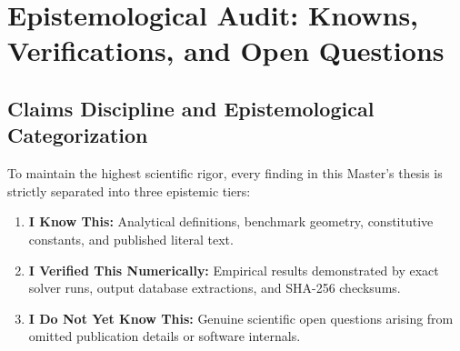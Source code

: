 \section{Epistemological Audit: Knowns, Verifications, and Open Questions}
\label{sec:epistemological_audit}

\subsection{Claims Discipline and Epistemological Categorization}
To maintain the highest scientific rigor, every finding in this Master's thesis is strictly separated into three epistemic tiers:
\begin{enumerate}[label=\textbf{Tier \arabic*:},leftmargin=18mm,itemsep=0.5pt,topsep=1pt]
  \item \textbf{I Know This:} Analytical definitions, benchmark geometry, constitutive constants, and published literal text.
  \item \textbf{I Verified This Numerically:} Empirical results demonstrated by exact solver runs, output database extractions, and SHA-256 checksums.
  \item \textbf{I Do Not Yet Know This:} Genuine scientific open questions arising from omitted publication details or software internals.
\end{enumerate}

